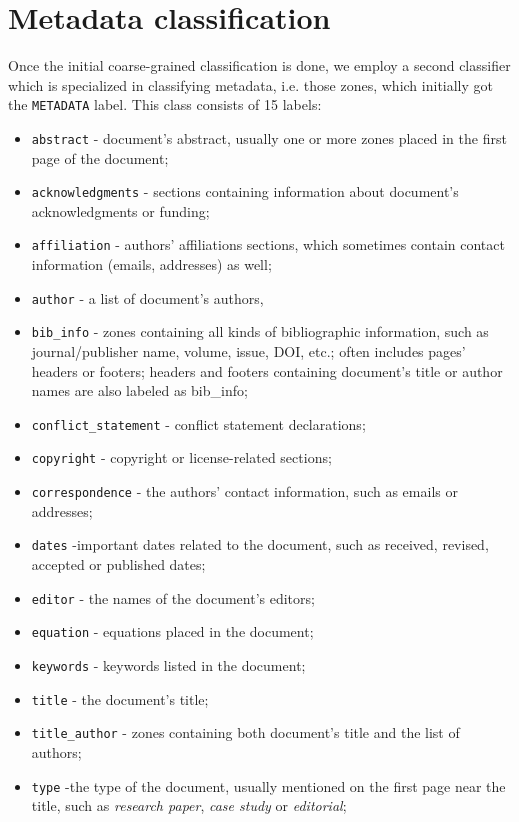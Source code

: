 \section{Metadata classification}
Once the initial coarse-grained classification is done, we employ a second classifier which is specialized in classifying metadata, i.e. those zones, which initially got the \verb+METADATA+ label. This class consists of 15 labels:
\begin{itemize}
    \item \verb+abstract+ - document's abstract, usually one or more zones placed in the first page of the document;
    \item \verb+acknowledgments+ - sections containing information about document's acknowledgments or funding;
    \item \verb+affiliation+ - authors' affiliations sections, which sometimes contain contact information (emails, addresses) as well;
    \item \verb+author+ - a list of document's authors,
    \item \verb+bib_info+ - zones containing all kinds of bibliographic information, such as journal/publisher name, volume, issue, DOI, etc.; often includes pages' headers or footers; headers and footers containing document's title or author names are also labeled as bib\_info;
    \item \verb+conflict_statement+ - conflict statement declarations;
    \item \verb+copyright+ - copyright or license-related sections;
    \item \verb+correspondence+ - the authors' contact information, such as emails or addresses;
    \item \verb+dates+ -important dates related to the document, such as received, revised, accepted or published dates;
    \item \verb+editor+ - the names of the document's editors;
    \item \verb+equation+ - equations placed in the document;
    \item \verb+keywords+ - keywords listed in the document;
    \item \verb+title+ - the document's title;
    \item \verb+title_author+ - zones containing both document's title and the list of authors;
    \item \verb+type+ -the type of the document, usually mentioned on the first page near the title, such as \textit{research paper}, \textit{case study} or \textit{editorial};
\end{itemize}

